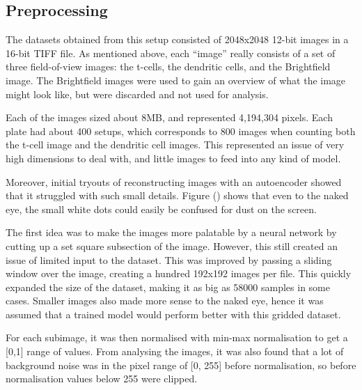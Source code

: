 \documentclass{l4proj}
\begin{document}
\subsection{Preprocessing}
The datasets obtained from this setup consisted of 2048x2048 12-bit images in a 16-bit TIFF file. As mentioned above, each ``image” really consists of a set of three field-of-view images: the t-cells, the dendritic cells, and the Brightfield image. The Brightfield images were used to gain an overview of what the image might look like, but were discarded and not used for analysis.


\bigskip
Each of the images sized about 8MB, and represented 4,194,304 pixels. Each plate had about 400 setups, which corresponds to 800 images when counting both the t-cell image and the dendritic cell images. This represented an issue of very high dimensions to deal with, and little images to feed into any kind of model.

\bigskip
Moreover, initial tryouts of reconstructing images with an autoencoder showed that it struggled with such small details. Figure () shows that even to the naked eye, the small white dots could easily be confused for dust on the screen.


\bigskip
The first idea was to make the images more palatable by a neural network by cutting up a set square subsection of the image. However, this still created an issue of limited input to the dataset. This was improved by passing a sliding window over the image, creating a hundred 192x192 images per file. This quickly expanded the size of the dataset, making it as big as 58000 samples in some cases. Smaller images also made more sense to the naked eye, hence it was assumed that a trained model would perform better with this gridded dataset.

\bigskip
For each subimage, it was then normalised with min-max normalisation to get a [0,1] range of values. From analysing the images, it was also found that a lot of background noise was in the pixel range of [0, 255] before normalisation, so before normalisation values below 255 were clipped.
\end{document}
